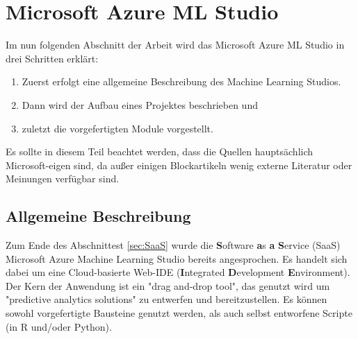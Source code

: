 \section{Microsoft Azure ML Studio}\label{sec:msmls}
Im nun folgenden Abschnitt der Arbeit wird das Microsoft Azure ML Studio in drei Schritten erklärt:
\begin{enumerate}
\item Zuerst erfolgt eine allgemeine Beschreibung des Machine Learning Studios.
\item Dann wird der Aufbau eines Projektes beschrieben und
\item zuletzt die vorgefertigten Module vorgestellt.
\end{enumerate}
Es sollte in diesem Teil beachtet werden, dass die Quellen hauptsächlich Microsoft-eigen sind, da außer einigen Blockartikeln wenig externe Literatur oder Meinungen verfügbar sind.
\subsection{Allgemeine Beschreibung}
Zum Ende des Abschnittest \ref{sec:SaaS} wurde die \textbf{S}oftware \textbf{a}s \textbf{a} \textbf{S}ervice (SaaS) Microsoft Azure Machine Learning Studio bereits angesprochen. Es handelt sich dabei um eine Cloud-basierte Web-IDE (\textbf{I}ntegrated \textbf{D}evelopment \textbf{E}nvironment). Der Kern der Anwendung ist ein "drag and-drop tool", das genutzt wird um "predictive analytics solutions" zu entwerfen und bereitzustellen.\citep{ericson_what_2017} Es können sowohl vorgefertigte Bausteine genutzt werden, als auch selbst entworfene Scripte (in R und/oder Python).
